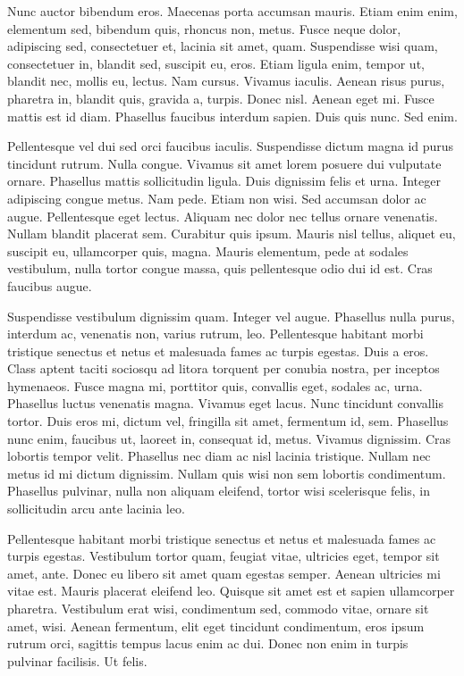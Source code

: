 Nunc auctor bibendum eros. Maecenas porta accumsan mauris. Etiam enim enim,
elementum sed, bibendum quis, rhoncus non, metus. Fusce neque dolor, adipiscing
sed, consectetuer et, lacinia sit amet, quam. Suspendisse wisi quam,
consectetuer in, blandit sed, suscipit eu, eros. Etiam ligula enim, tempor ut,
blandit nec, mollis eu, lectus. Nam cursus. Vivamus iaculis. Aenean risus
purus, pharetra in, blandit quis, gravida a, turpis. Donec nisl. Aenean eget
mi. Fusce mattis est id diam. Phasellus faucibus interdum sapien. Duis quis
nunc. Sed enim.

Pellentesque vel dui sed orci faucibus iaculis. Suspendisse dictum magna id
purus tincidunt rutrum. Nulla congue. Vivamus sit amet lorem posuere dui
vulputate ornare. Phasellus mattis sollicitudin ligula. Duis dignissim felis et
urna. Integer adipiscing congue metus. Nam pede. Etiam non wisi. Sed accumsan
dolor ac augue. Pellentesque eget lectus. Aliquam nec dolor nec tellus ornare
venenatis. Nullam blandit placerat sem. Curabitur quis ipsum. Mauris nisl
tellus, aliquet eu, suscipit eu, ullamcorper quis, magna. Mauris elementum,
pede at sodales vestibulum, nulla tortor congue massa, quis pellentesque odio
dui id est. Cras faucibus augue.

Suspendisse vestibulum dignissim quam. Integer vel augue. Phasellus nulla
purus, interdum ac, venenatis non, varius rutrum, leo. Pellentesque habitant
morbi tristique senectus et netus et malesuada fames ac turpis egestas. Duis a
eros. Class aptent taciti sociosqu ad litora torquent per conubia nostra, per
inceptos hymenaeos. Fusce magna mi, porttitor quis, convallis eget, sodales ac,
urna. Phasellus luctus venenatis magna. Vivamus eget lacus. Nunc tincidunt
convallis tortor. Duis eros mi, dictum vel, fringilla sit amet, fermentum id,
sem. Phasellus nunc enim, faucibus ut, laoreet in, consequat id, metus. Vivamus
dignissim. Cras lobortis tempor velit. Phasellus nec diam ac nisl lacinia
tristique. Nullam nec metus id mi dictum dignissim. Nullam quis wisi non sem
lobortis condimentum. Phasellus pulvinar, nulla non aliquam eleifend, tortor
wisi scelerisque felis, in sollicitudin arcu ante lacinia leo.

Pellentesque habitant morbi tristique senectus et netus et malesuada fames ac
turpis egestas. Vestibulum tortor quam, feugiat vitae, ultricies eget, tempor
sit amet, ante. Donec eu libero sit amet quam egestas semper. Aenean ultricies
mi vitae est. Mauris placerat eleifend leo. Quisque sit amet est et sapien
ullamcorper pharetra. Vestibulum erat wisi, condimentum sed, commodo vitae,
ornare sit amet, wisi. Aenean fermentum, elit eget tincidunt condimentum, eros
ipsum rutrum orci, sagittis tempus lacus enim ac dui. Donec non enim in turpis
pulvinar facilisis. Ut felis.

